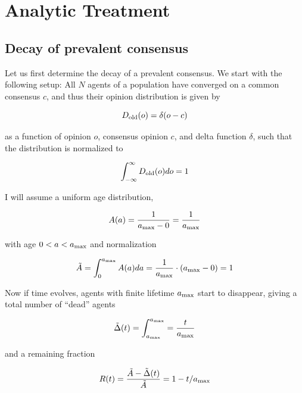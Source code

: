 \documentclass[useAMS,usenatbib]{templates/mn2e}
\begin{document}
\section{Analytic Treatment}
\label{sec:analytic}

\subsection{Decay of prevalent consensus}
Let us first determine the decay of a prevalent consensus. We start
with the following setup: All $N$ agents of a population have converged on
a common consensus $c$, and thus their opinion distribution is given
by

\begin{equation}
    \label{eq:opiniondistribution_consensus}
    D_{\rm old}(o)=\delta(o-c)
\end{equation}

as a function of opinion $o$, consensus opinion $c$, and delta
function $\delta$, such that the distribution is normalized to

\begin{equation}
    \label{eq:opiniondistribution_consensus_normalization}
    \int_{-\infty}^{\infty} D_{\rm old}(o) do = 1
\end{equation}

I will assume a uniform age distribution,

\begin{equation}
    \label{eq:agedistribution}
    A(a) = \frac{1}{a_{\rm max}-0} = \frac{1}{a_{\rm max}}
\end{equation}

with age $0<a<a_{\rm max}$ and normalization

\begin{equation}
    \label{eq:agedistribution_normalization}
    \tilde{A} = \int_0^{a_{\rm max}} A(a) da = \frac{1}{a_{\rm max}} \cdot (a_{\rm max}-0) = 1
\end{equation}

Now if time evolves, agents with finite lifetime $a_{\rm max}$ start
to disappear, giving a total number of ``dead'' agents

\begin{equation}
    \tilde{\Delta}(t) = \int_{a_{\rm max}}^{a_{\rm max}} = \frac{t}{a_{\rm max}}
\end{equation}

and a remaining fraction

\begin{equation}
    R(t) = \frac{\tilde{A}-\tilde{\Delta}(t)}{\tilde{A}} = 1-t/a_{\rm max}
\end{equation}
\end{document}
